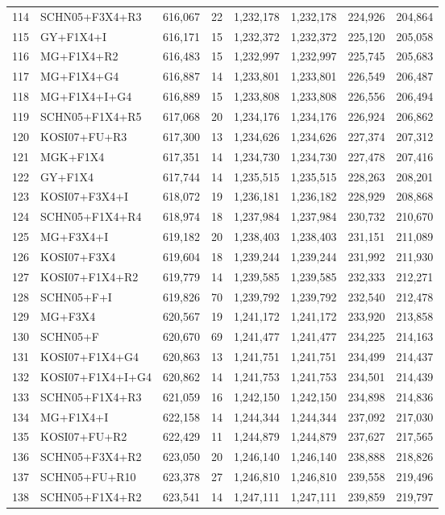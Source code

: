 \begin{longtable}{rlrrrrrr}
114&SCHN05+F3X4+R3&616,067&22&1,232,178&1,232,178&224,926&204,864\\
115&GY+F1X4+I&616,171&15&1,232,372&1,232,372&225,120&205,058\\
116&MG+F1X4+R2&616,483&15&1,232,997&1,232,997&225,745&205,683\\
117&MG+F1X4+G4&616,887&14&1,233,801&1,233,801&226,549&206,487\\
118&MG+F1X4+I+G4&616,889&15&1,233,808&1,233,808&226,556&206,494\\
119&SCHN05+F1X4+R5&617,068&20&1,234,176&1,234,176&226,924&206,862\\
120&KOSI07+FU+R3&617,300&13&1,234,626&1,234,626&227,374&207,312\\
121&MGK+F1X4&617,351&14&1,234,730&1,234,730&227,478&207,416\\
122&GY+F1X4&617,744&14&1,235,515&1,235,515&228,263&208,201\\
123&KOSI07+F3X4+I&618,072&19&1,236,181&1,236,182&228,929&208,868\\
124&SCHN05+F1X4+R4&618,974&18&1,237,984&1,237,984&230,732&210,670\\
125&MG+F3X4+I&619,182&20&1,238,403&1,238,403&231,151&211,089\\
126&KOSI07+F3X4&619,604&18&1,239,244&1,239,244&231,992&211,930\\
127&KOSI07+F1X4+R2&619,779&14&1,239,585&1,239,585&232,333&212,271\\
128&SCHN05+F+I&619,826&70&1,239,792&1,239,792&232,540&212,478\\
129&MG+F3X4&620,567&19&1,241,172&1,241,172&233,920&213,858\\
130&SCHN05+F&620,670&69&1,241,477&1,241,477&234,225&214,163\\
131&KOSI07+F1X4+G4&620,863&13&1,241,751&1,241,751&234,499&214,437\\
132&KOSI07+F1X4+I+G4&620,862&14&1,241,753&1,241,753&234,501&214,439\\
133&SCHN05+F1X4+R3&621,059&16&1,242,150&1,242,150&234,898&214,836\\
134&MG+F1X4+I&622,158&14&1,244,344&1,244,344&237,092&217,030\\
135&KOSI07+FU+R2&622,429&11&1,244,879&1,244,879&237,627&217,565\\
136&SCHN05+F3X4+R2&623,050&20&1,246,140&1,246,140&238,888&218,826\\
137&SCHN05+FU+R10&623,378&27&1,246,810&1,246,810&239,558&219,496\\
138&SCHN05+F1X4+R2&623,541&14&1,247,111&1,247,111&239,859&219,797\\

\end{longtable}
